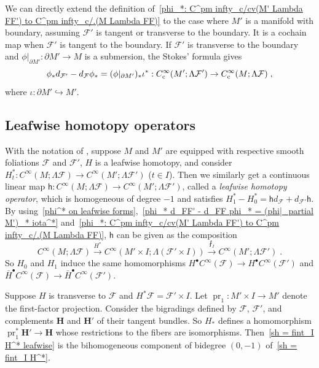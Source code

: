\documentclass{memo-l}
\theoremstyle{plain}
\theoremstyle{definition}
\theoremstyle{remark}
\newcommand{\FF}{\mathcal{F}}
\newcommand{\bfH}{\boldsymbol{H}}
\newcommand{\sh}{\mathsf{h}}
\newcommand{\pr}{\operatorname{pr}}
\newcommand{\Cinftyc}{C^\infty_{\text{\rm c}}}
\numberwithin{section}{chapter}
\numberwithin{equation}{section}%
\begin{document}
We can directly extend the definition of~\eqref{phi_*: C^pm infty_c/cv(M' Lambda FF') to C^pm infty_c/.(M Lambda FF)} to the case where $M'$ is a manifold with boundary, assuming $\FF'$ is tangent or transverse to the boundary. It is a cochain map when $\FF'$ is tangent to the boundary. If $\FF'$ is transverse to the boundary and $\phi|_{\partial M'}:\partial M'\to M$ is a submersion, the Stokes' formula gives
\begin{equation}\label{phi_* d_FF' - d_FF phi_* = (phi|_partial M')_* iota^*}
\phi_*d_{\FF'}-d_\FF\phi_*=(\phi|_{\partial M'})_*\iota^*:\Cinftyc(M';\Lambda\FF')\to\Cinftyc(M;\Lambda\FF)\;,
\end{equation}
where $\iota:\partial M'\hookrightarrow M'$. 



\subsection{Leafwise homotopy operators}\label{ss: leafwise homotopy opers}

With the notation of , suppose $M$ and $M'$ are equipped with respective smooth foliations $\FF$ and $\FF'$, $H$ is a leafwise homotopy, and consider $H_t^*:C^\infty(M;\Lambda\FF)\to C^\infty(M';\Lambda\FF')$ ($t\in I$). Then we similarly get a continuous linear map $\sh:C^\infty(M;\Lambda\FF)\to C^\infty(M';\Lambda\FF')$, called a \emph{leafwise homotopy operator}, which is homogeneous of degree $-1$ and satisfies $H_1^*-H_0^*=\sh d_\FF+d_{\FF'}\sh$. By using~\eqref{phi^* on leafwise forms},~\eqref{phi_* d_FF' - d_FF phi_* = (phi|_partial M')_* iota^*} and~\eqref{phi_*: C^pm infty_c/cv(M' Lambda FF') to C^pm infty_c/.(M Lambda FF)}, $\sh$ can be given as the composition
\begin{equation}\label{sh = fint_I H^* leafwise}
C^\infty(M;\Lambda\FF) \xrightarrow{H^*} C^\infty(M'\times I;\Lambda(\FF'\times I))
\xrightarrow{\fint_I} C^\infty(M';\Lambda\FF')\;.
\end{equation}
So $H_0$ and $H_1$ induce the same homomorphisms $H^\bullet C^\infty(\FF)\to H^\bullet C^\infty(\FF')$ and $\bar H^\bullet C^\infty(\FF)\to\bar H^\bullet C^\infty(\FF')$. 

Suppose $H$ is transverse to $\FF$ and $H^*\FF=\FF'\times I$. Let $\pr_1:M'\times I\to M'$ denote the first-factor projection. Consider the bigradings defined by $\FF$, $\FF'$, and complements $\bfH$ and $\bfH'$ of their tangent bundles. So $H_*$ defines a homomorphism $\pr_1^*\bfH'\to\bfH$ whose restrictions to the fibers are isomorphisms. Then~\eqref{sh = fint_I H^* leafwise} is the bihomogeneous component of bidegree $(0,-1)$ of~\eqref{sh = fint_I H^*}.
\end{document}
